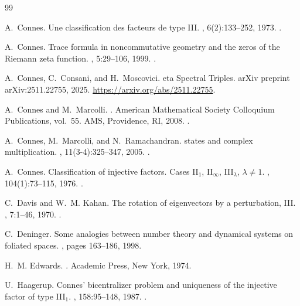 \begin{thebibliography}{99}

A.~Connes.
\newblock Une classification des facteurs de type {III}.
, 6(2):133--252, 1973.
\newblock {}.

A.~Connes.
\newblock Trace formula in noncommutative geometry and the zeros of the
  {R}iemann zeta function.
, 5:29--106, 1999.
\newblock {}.

A.~Connes, C.~Consani, and H.~Moscovici.
eta {S}pectral {T}riples.
\newblock arXiv preprint arXiv:2511.22755, 2025.
\newblock \url{https://arxiv.org/abs/2511.22755}.

A.~Connes and M.~Marcolli.
.
\newblock American Mathematical Society Colloquium Publications, vol.~55. AMS,
  Providence, RI, 2008.
\newblock {}.

A.~Connes, M.~Marcolli, and N.~Ramachandran.
 states and complex multiplication.
, 11(3-4):325--347, 2005.
\newblock {}.

A.~Connes.
\newblock Classification of injective factors. {C}ases {II}$_1$,
  {II}$_\infty$, {III}$_\lambda$, $\lambda \neq 1$.
, 104(1):73--115, 1976.
\newblock {}.


C.~Davis and W.~M. Kahan.
\newblock The rotation of eigenvectors by a perturbation, {III}.
, 7:1--46, 1970.
\newblock {}.

C.~Deninger.
\newblock Some analogies between number theory and dynamical systems on
  foliated spaces.
, pages 163--186, 1998.


H.~M. Edwards.
.
\newblock Academic Press, New York, 1974.


U.~Haagerup.
\newblock Connes' bicentralizer problem and uniqueness of the injective factor
  of type {III}$_1$.
, 158:95--148, 1987.
\newblock {}.


\end{thebibliography}
